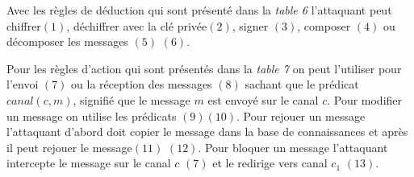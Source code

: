 \documentclass[10pt,a4paper]{article}
\begin{document}
Avec les règles de déduction qui sont présenté dans la \textit{table 6} l'attaquant peut chiffrer$(1)$,   déchiffrer avec la clé privée$(2)$, signer $(3)$, composer $(4)$ ou décomposer les messages $(5)$ $(6)$.\newline

Pour les règles d'action qui sont présentés dans la \textit{table 7} on peut l'utiliser pour  l'envoi $(7)$ ou la réception des messages $(8)$ sachant que le prédicat $canal(c,m)$, signifié que le message $m$ est envoyé sur le canal $c$. Pour modifier un message on utilise les prédicats $(9)(10)$. Pour rejouer un message l'attaquant d'abord doit copier le message dans la base de connaissances et après il peut rejouer le message$(11)$ $(12)$. Pour bloquer un message l’attaquant intercepte le message sur le canal $c$ $(7)$ et le redirige vers canal $c_{1}$ $(13)$.
\end{document}
